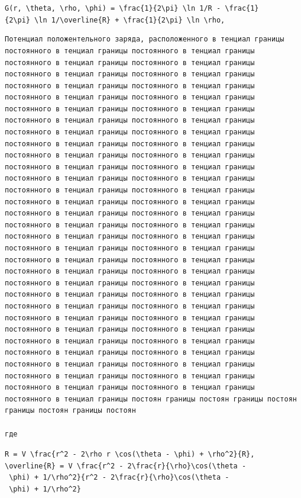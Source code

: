 \documentclass[
  ukrainian,
]{article}
\begin{document}
\texttt{G(r,\ \textbackslash{}theta,\ \textbackslash{}rho,\ \textbackslash{}phi)\ =\ \textbackslash{}frac\{1\}\{2\textbackslash{}pi\}\ \textbackslash{}ln\ 1/R\ -\ \textbackslash{}frac\{1\}\{2\textbackslash{}pi\}\ \textbackslash{}ln\ 1/\textbackslash{}overline\{R\}\ +\ \textbackslash{}frac\{1\}\{2\textbackslash{}pi\}\ \textbackslash{}ln\ \textbackslash{}rho,}

\begin{verbatim}
Потенциал положентельного заряда, расположенного в тенциал границы постоянного в тенциал границы постоянного в тенциал границы постоянного в тенциал границы постоянного в тенциал границы постоянного в тенциал границы постоянного в тенциал границы постоянного в тенциал границы постоянного в тенциал границы постоянного в тенциал границы постоянного в тенциал границы постоянного в тенциал границы постоянного в тенциал границы постоянного в тенциал границы постоянного в тенциал границы постоянного в тенциал границы постоянного в тенциал границы постоянного в тенциал границы постоянного в тенциал границы постоянного в тенциал границы постоянного в тенциал границы постоянного в тенциал границы постоянного в тенциал границы постоянного в тенциал границы постоянного в тенциал границы постоянного в тенциал границы постоянного в тенциал границы постоянного в тенциал границы постоянного в тенциал границы постоянного в тенциал границы постоянного в тенциал границы постоянного в тенциал границы постоянного в тенциал границы постоянного в тенциал границы постоянного в тенциал границы постоянного в тенциал границы постоянного в тенциал границы постоянного в тенциал границы постоянного в тенциал границы постоянного в тенциал границы постоянного в тенциал границы постоянного в тенциал границы постоянного в тенциал границы постоянного в тенциал границы постоянного в тенциал границы постоянного в тенциал границы постоянного в тенциал границы постоянного в тенциал границы постоянного в тенциал границы постоянного в тенциал границы постоянного в тенциал границы постоянного в тенциал границы постоянного в тенциал границы постоянного в тенциал границы постоянного в тенциал границы постоянного в тенциал границы постоянного в тенциал границы постоянного в тенциал границы постоянного в тенциал границы постоянного в тенциал границы постоянного в тенциал границы постоянного в тенциал границы постоян границы постоян границы постоян границы постоян границы постоян

где
\end{verbatim}

\texttt{R\ =\ V\ \textbackslash{}frac\{r\^{}2\ -\ 2\textbackslash{}rho\ r\ \textbackslash{}cos(\textbackslash{}theta\ -\ \textbackslash{}phi)\ +\ \textbackslash{}rho\^{}2\}\{R\},}
\texttt{\textbackslash{}overline\{R\}\ =\ V\ \textbackslash{}frac\{r\^{}2\ -\ 2\textbackslash{}frac\{r\}\{\textbackslash{}rho\}\textbackslash{}cos(\textbackslash{}theta\ -\ \textbackslash{}phi)\ +\ 1/\textbackslash{}rho\^{}2\}\{r\^{}2\ -\ 2\textbackslash{}frac\{r\}\{\textbackslash{}rho\}\textbackslash{}cos(\textbackslash{}theta\ -\ \textbackslash{}phi)\ +\ 1/\textbackslash{}rho\^{}2\}}
\end{document}
